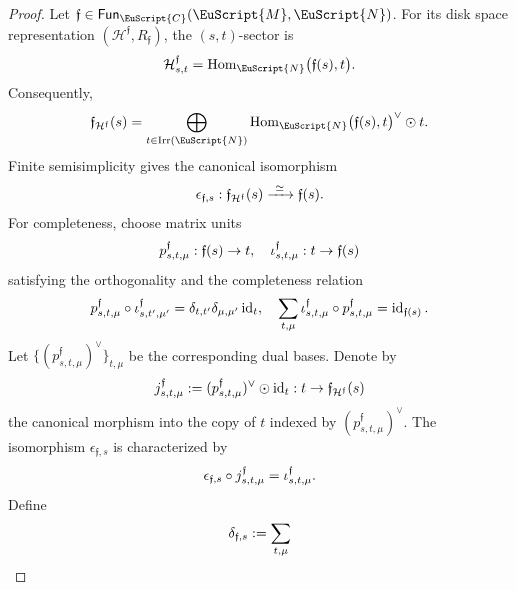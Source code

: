 \documentclass[a4paper,11pt]{article}
\theoremstyle{definition}
\theoremstyle{remark}
\newcommand\eC           {\EuScript{C}}
\newcommand\eM          {\EuScript{M}}
\newcommand\eN         {\EuScript{N}}
\newcommand{\id}{\operatorname{id}}
\newcommand{\Irr}{\operatorname{Irr}}
\newcommand{\Hom}{\operatorname{Hom}}
\newcommand{\Fun}{\mathsf{Fun}}
\begin{document}
\begin{proof}
Let $\mathfrak{f}\in\Fun_{\eC}(\eM,\eN)$.  For its disk space representation $(\mathcal H^{\mathfrak{f}},R_{\mathfrak{f}})$, the $(s,t)$-sector is
\begin{equation}
    \notag
    \mathcal H^{\mathfrak{f}}_{s,t}
    =
    \Hom_{\eN}\bigl(\mathfrak{f}(s),t\bigr).
\end{equation}
Consequently,
\begin{equation}
    \notag
    \mathfrak{f}_{\mathcal H^{\mathfrak{f}}}(s)
    =
    \bigoplus_{t\in\Irr(\eN)}
    \Hom_{\eN}\bigl(\mathfrak{f}(s),t\bigr)^{\vee}
    \odot t.
\end{equation}
Finite semisimplicity gives the canonical isomorphism
\begin{equation}
    \notag
    \epsilon_{\mathfrak{f},s}:
    \mathfrak{f}_{\mathcal H^{\mathfrak{f}}}(s)
    \xrightarrow{\ \simeq\ }
    \mathfrak{f}(s).
\end{equation}
For completeness, choose matrix units
\begin{equation}
    \notag
    p^{\mathfrak{f}}_{s,t,\mu}:
    \mathfrak{f}(s)\to  t,
    \quad
    \iota^{\mathfrak{f}}_{s,t,\mu}:
    t\to \mathfrak{f}(s)
\end{equation}
satisfying the orthogonality and the completeness relation
\begin{equation}
    \notag
        p^{\mathfrak{f}}_{s,t,\mu}
        \circ
        \iota^{\mathfrak{f}}_{s,t',\mu'}
        =
        \delta_{t,t'}\delta_{\mu,\mu'}
        \id_t,
        \quad
        \sum_{t,\mu}
        \iota^{\mathfrak{f}}_{s,t,\mu}
        \circ
        p^{\mathfrak{f}}_{s,t,\mu}
        =
        \id_{\mathfrak{f}(s)}.
\end{equation}
Let $\{(p^{\mathfrak f}_{s,t,\mu})^{\vee}\}_{t,\mu}$ be the corresponding dual bases. Denote by
\begin{equation}
    \notag
    j^{\mathfrak f}_{s,t,\mu}:=
    (p^{\mathfrak f}_{s,t,\mu})^{\vee}
    \odot\id_t: t\to
    \mathfrak f_{\mathcal H^{\mathfrak f}}(s)
\end{equation}
the canonical morphism into the copy of $t$ indexed by $(p^{\mathfrak f}_{s,t,\mu})^{\vee}$. The isomorphism $\epsilon_{\mathfrak f,s}$ is characterized by
\begin{equation}
    \notag
    \epsilon_{\mathfrak f,s}
    \circ
    j^{\mathfrak f}_{s,t,\mu}
    =
    \iota^{\mathfrak f}_{s,t,\mu}.
\end{equation}
Define
\begin{equation}
    \notag
    \delta_{\mathfrak f,s} :=
    \sum_{t,\mu}

\end{equation}
\end{proof}
\end{document}
